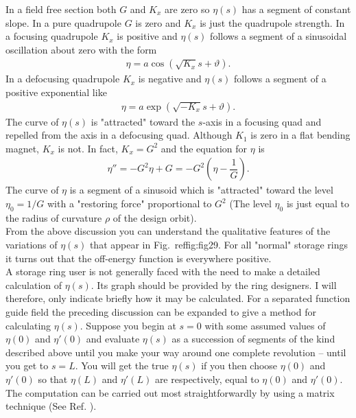 In a field free section both $G$ and $K_x$ are zero so $\eta(s)$ has a segment of constant
slope. In a pure quadrupole $G$ is zero and $K_x$ is just the quadrupole strength. In
a focusing quadrupole $K_x$ is positive and $\eta(s)$ follows a segment of a sinusoidal
oscillation about zero with the form
\begin{align*}
	\eta = a \cos(\sqrt{K_x}s + \vartheta).
\end{align*}
In a defocusing quadrupole $K_x$ is negative and $\eta(s)$ follows a segment of a positive
exponential like
\begin{align*}
	\eta = a \exp(\sqrt{-K_x}s+\vartheta).
\end{align*}
The curve of $\eta(s)$ is "attracted" toward the $s$-axis in a focusing quad and repelled
from the axis in a defocusing quad.
Although $K_1$ is zero in a flat bending magnet, $K_x$ is not. In fact, $K_x = G^2$ and
the equation for $\eta$ is
\begin{align}
	\eta'' = -G^2\eta + G = -G^2\left( \eta - \dfrac{1}{G} \right).
\end{align}
The curve of $\eta$ is a segment of a sinusoid which is "attracted" toward the level
$\eta_0 = 1/G$ with a "restoring force" proportional to $G^2$ (The level $\eta_0$ is just equal
to the radius of curvature $\rho$ of the design orbit).\\
From the above discussion you can understand the qualitative features of the variations
 of $\eta(s)$ that appear in Fig.~ref{fig:fig29}. For all "normal" storage rings it turns
out that the off-energy function is everywhere positive.\\
A storage ring user is not generally faced with the need to make a detailed calculation of $\eta(s)$. Its graph should be provided by the ring designers. I will therefore, only indicate briefly how it may be calculated. For a separated function guide field the preceding discussion can be expanded to give a method for calculating $\eta(s)$. Suppose you begin at $s = 0$ with some assumed values of $\eta(0)$ and $\eta'(0)$ and evaluate $\eta(s)$ as a succession of segments of the kind described above until you make your way around one complete revolution -- until you get to $s = L$. You will get the true $\eta(s)$ if you then choose $\eta(0)$ and $\eta'(0)$ so that $\eta(L)$ and $\eta'(L)$ are respectively, equal to $\eta(0)$ and $\eta'(0)$. The computation can be carried out most straightforwardly by using a matrix technique (See Ref. \cite{11}).\\
